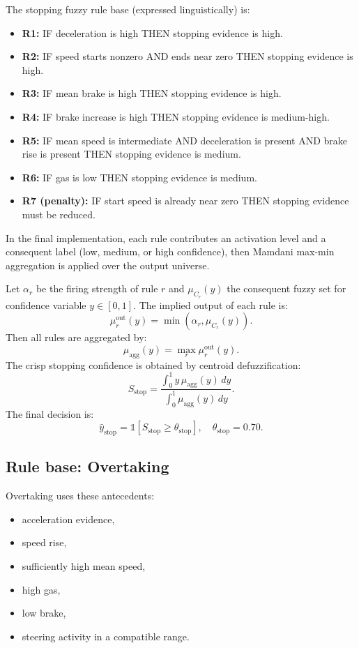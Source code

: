 \documentclass[11pt,a4paper]{article}
\begin{document}
The stopping fuzzy rule base (expressed linguistically) is:
\begin{itemize}
    \item \textbf{R1:} IF deceleration is high THEN stopping evidence is high.
    \item \textbf{R2:} IF speed starts nonzero AND ends near zero THEN stopping evidence is high.
    \item \textbf{R3:} IF mean brake is high THEN stopping evidence is high.
    \item \textbf{R4:} IF brake increase is high THEN stopping evidence is medium-high.
    \item \textbf{R5:} IF mean speed is intermediate AND deceleration is present AND brake rise is present THEN stopping evidence is medium.
    \item \textbf{R6:} IF gas is low THEN stopping evidence is medium.
    \item \textbf{R7 (penalty):} IF start speed is already near zero THEN stopping evidence must be reduced.
\end{itemize}

In the final implementation, each rule contributes an activation level and a consequent label (low, medium, or high confidence), then Mamdani max-min aggregation is applied over the output universe.

Let $\alpha_r$ be the firing strength of rule $r$ and $\mu_{C_r}(y)$ the consequent fuzzy set for confidence variable $y\in[0,1]$. The implied output of each rule is:
\[
\mu_r^{\text{out}}(y)=\min\left(\alpha_r,\mu_{C_r}(y)\right).
\]
Then all rules are aggregated by:
\[
\mu_{\text{agg}}(y)=\max_r\mu_r^{\text{out}}(y).
\]
The crisp stopping confidence is obtained by centroid defuzzification:
\[
S_{\text{stop}}=\frac{\int_0^1 y\,\mu_{\text{agg}}(y)\,dy}{\int_0^1 \mu_{\text{agg}}(y)\,dy}.
\]
The final decision is:
\[
\hat{y}_{\text{stop}}=\mathbb{1}[S_{\text{stop}}\ge \theta_{\text{stop}}], \quad \theta_{\text{stop}}=0.70.
\]

\subsection{Rule base: Overtaking}
Overtaking uses these antecedents:
\begin{itemize}
    \item acceleration evidence,
    \item speed rise,
    \item sufficiently high mean speed,
    \item high gas,
    \item low brake,
    \item steering activity in a compatible range.
\end{itemize}
\end{document}
